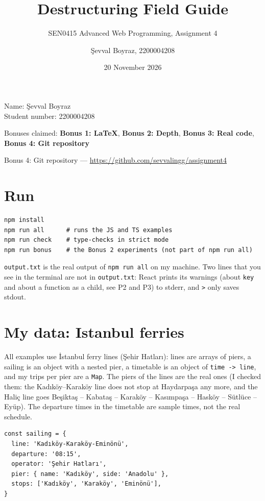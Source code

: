 \documentclass[
  10pt,
]{article}
\title{Destructuring Field Guide}
\subtitle{SEN0415 Advanced Web Programming, Assignment 4}
\author{Şevval Boyraz, 2200004208}
\date{20 November 2026}
\begin{document}
\maketitle

{
\setcounter{tocdepth}{3}
\tableofcontents
}
Name: Şevval Boyraz\\
Student number: 2200004208

Bonuses claimed: \textbf{Bonus 1: LaTeX}, \textbf{Bonus 2: Depth},
\textbf{Bonus 3: Real code}, \textbf{Bonus 4: Git repository}

Bonus 4: Git repository ---
\url{https://github.com/sevvalingg/assignment4}

\hypertarget{run}{%
\section{Run}\label{run}}

\begin{verbatim}
npm install
npm run all      # runs the JS and TS examples
npm run check    # type-checks in strict mode
npm run bonus    # the Bonus 2 experiments (not part of npm run all)
\end{verbatim}

\texttt{output.\allowbreak{}txt} is the real output of
\texttt{npm run all} on my machine. Two lines that you see in the
terminal are not in \texttt{output.\allowbreak{}txt}: React prints its
warnings (about \texttt{key} and about a function as a child, see P2 and
P3) to stderr, and \texttt{>} only saves stdout.

\hypertarget{my-data-istanbul-ferries}{%
\section{My data: Istanbul ferries}\label{my-data-istanbul-ferries}}

All examples use İstanbul ferry lines (Şehir Hatları): lines are arrays
of piers, a sailing is an object with a nested pier, a timetable is an
object of \texttt{time -> line}, and my trips per pier are a
\texttt{Map}. The piers of the lines are the real ones (I checked them:
the Kadıköy--Karaköy line does not stop at Haydarpaşa any more, and the
Haliç line goes Beşiktaş -- Kabataş -- Karaköy -- Kasımpaşa -- Hasköy --
Sütlüce -- Eyüp). The departure times in the timetable are sample times,
not the real schedule.

\begin{verbatim}
const sailing = {
  line: 'Kadıköy-Karaköy-Eminönü',
  departure: '08:15',
  operator: 'Şehir Hatları',
  pier: { name: 'Kadıköy', side: 'Anadolu' },
  stops: ['Kadıköy', 'Karaköy', 'Eminönü'],
}
\end{verbatim}
\end{document}
